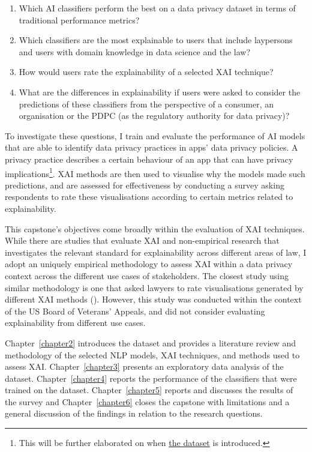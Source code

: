 \begin{enumerate}
  \item Which AI classifiers perform the best on a data privacy dataset in terms of traditional performance metrics?
  \item Which classifiers are the most explainable to users that include laypersons and users with domain knowledge in data science and the law?
  \item How would users rate the explainability of a selected XAI technique?
  \item What are the differences in explainability if users were asked to consider the predictions of these classifiers from the perspective of a consumer, an organisation or the PDPC (as the regulatory authority for data privacy)?
\end{enumerate}

To investigate these questions, I train and evaluate the performance of AI models that are able to identify data privacy practices in apps' data privacy policies. A privacy practice describes a certain behaviour of an app that can have privacy implications\footnote{This will be further elaborated on when \hyperref[app350_corpus]{the dataset} is introduced.}. XAI methods are then used to visualise why the models made such predictions, and are assessed for effectiveness by conducting a survey asking respondents to rate these visualisations according to certain metrics related to explainability.

This capstone's objectives come broadly within the evaluation of XAI techniques. While there are studies that evaluate XAI and non-empirical research that investigates the relevant standard for explainability across different areas of law, I adopt an uniquely empirical methodology to assess XAI within a data privacy context across the different use cases of stakeholders. The closest study using similar methodology is one that asked lawyers to rate visualisations generated by different XAI methods (\cite{gorski2021}). However, this study was conducted within the context of the US Board of Veterans' Appeals, and did not consider evaluating explainability from different use cases.

Chapter~\ref{chapter2} introduces the dataset and provides a literature review and methodology of the selected NLP models, XAI techniques, and methods used to assess XAI. Chapter~\ref{chapter3} presents an exploratory data analysis of the dataset. Chapter~\ref{chapter4} reports the performance of the classifiers that were trained on the dataset. Chapter~\ref{chapter5} reports and discusses the results of the survey and Chapter~\ref{chapter6} closes the capstone with limitations and a general discussion of the findings in relation to the research questions.